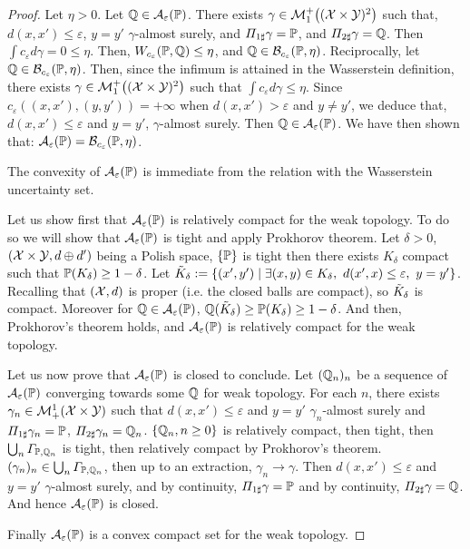 \begin{proof}
Let $\eta>0$. Let $\mathbb{Q}\in\mathcal{A}_\varepsilon(\mathbb{P})$. There exists $\gamma\in
\mathcal{M}^+_1\left((\XX\times\YY)^2\right)$ such that, $d(x,x')\leq\varepsilon$, $y=y'$ $\gamma$-almost surely, and $\Pi_{1\sharp}\gamma=\mathbb{P}$, and $\Pi_{2\sharp}\gamma=\mathbb{Q}$. Then $\int c_\varepsilon d \gamma = 0\leq \eta$. Then, $W_{c_\varepsilon}(\mathbb{P},\mathbb{Q})\leq \eta$, and $\mathbb{Q}\in\mathcal{B}_{c_\varepsilon}(\mathbb{P},\eta)$. Reciprocally, let $\mathbb{Q}\in\mathcal{B}_{c_\varepsilon}(\mathbb{P},\eta)$. Then, since the infimum is attained in the Wasserstein definition, there exists $\gamma\in
\mathcal{M}^+_1\left((\XX\times\YY)^2\right)$ such that $\int c_\varepsilon d \gamma \leq \eta$. Since $c_\varepsilon((x,x'),(y,y'))=+\infty$ when $d(x,x')>\varepsilon$ and $y\neq y'$, we deduce that, $d(x,x')\leq\varepsilon$ and $y=y'$, $\gamma$-almost surely. Then $\mathbb{Q}\in\mathcal{A}_\varepsilon(\mathbb{P})$. We have then shown that: $\mathcal{A}_\varepsilon(\mathbb{P})=\mathcal{B}_{c_\varepsilon}(\mathbb{P},\eta)$.

The convexity of $\mathcal{A}_\varepsilon(\mathbb{P})$ is  immediate from the relation with the Wasserstein uncertainty set.

Let us show first that $\mathcal{A}_\varepsilon(\mathbb{P})$ is relatively compact for the weak topology. To do so we will show that $\mathcal{A}_\varepsilon(\mathbb{P})$ is tight and apply Prokhorov theorem. Let $\delta>0$, $(\mathcal{X}\times \mathcal{Y},d\oplus d')$ being a Polish space, $\{\mathbb{P}\}$ is tight then there exists $K_\delta$ compact such that $\mathbb{P}(K_\delta)\geq1-\delta$.
Let $\Tilde{K}_\delta:=\left\{(x',y')\mid \exists (x,y)\in K_\delta,~ d(x',x)\leq\varepsilon,~y=y'\right\}$.  Recalling that $(\mathcal{X},d)$ is proper (i.e. the closed balls are compact), so $\Tilde{K}_\delta$ is compact. Moreover for $\mathbb{Q}\in\mathcal{A}_\varepsilon(\mathbb{P})$, $\mathbb{Q}(\Tilde{K}_\delta)\geq \mathbb{P}(K_\delta)\geq 1-\delta$. And then, Prokhorov's theorem holds, and $\mathcal{A}_\varepsilon(\mathbb{P})$ is relatively compact for the weak topology.

Let us now prove that $\mathcal{A}_\varepsilon(\mathbb{P})$ is closed to conclude.  Let $(\mathbb{Q}_n)_n$ be a sequence of $\mathcal{A}_\varepsilon(\mathbb{P})$ converging towards some $\mathbb{Q}$ for weak topology. For each $n$, there exists $\gamma_n\in \mathcal{M}^1_+(\mathcal{X}\times\mathcal{Y})$ such that $d(x,x')\leq\varepsilon$ and $y=y'$ $\gamma_n$-almost surely and $\Pi_{1\sharp}\gamma_n=\mathbb{P}$, $\Pi_{2\sharp}\gamma_n=\mathbb{Q}_n$. $\{\mathbb{Q}_n,n\geq0\}$ is relatively compact, then tight, then $\bigcup_n \Gamma_{\mathbb{P},\mathbb{Q}_n}$ is tight, then relatively compact by Prokhorov's theorem. $(\gamma_n)_n\in\bigcup_n \Gamma_{\mathbb{P},\mathbb{Q}_n}$, then up to an extraction,  $\gamma_n\to\gamma$. Then $d(x,x')\leq\varepsilon$ and $y=y'$ $\gamma$-almost surely, and by continuity, $\Pi_{1\sharp}\gamma=\mathbb{P}$ and by continuity, $\Pi_{2\sharp}\gamma=\mathbb{Q}$. And hence $\mathcal{A}_\varepsilon(\mathbb{P})$ is closed.

Finally $\mathcal{A}_\varepsilon(\mathbb{P})$ is a convex compact set for the weak topology. 
\end{proof}




